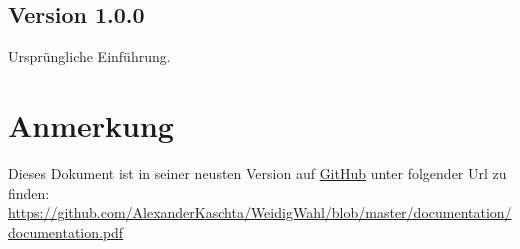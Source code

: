 \documentclass[ngerman]{ltxdoc}
\begin{document}
\subsection*{Version 1.0.0}

Ursprüngliche Einführung.

\section*{Anmerkung}

Dieses Dokument ist in seiner neusten Version auf \href{https://github.com/AlexanderKaschta/WeidigWahl}{GitHub} unter
folgender Url zu finden: \href{https://github.com/AlexanderKaschta/WeidigWahl/blob/master/documentation/documentation.pdf}{\url{https://github.com/AlexanderKaschta/WeidigWahl/blob/master/documentation/documentation.pdf}}
\end{document}
